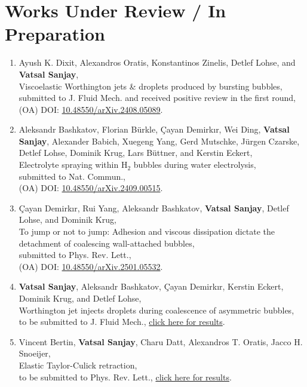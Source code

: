 \documentclass[10pt,a4paper,colorlinks,linkcolor=blue,urlcolor=blue,citecolor=blue]{moderncv}
\begin{document}
\section{Works Under Review / In Preparation}
\begin{enumerate}[leftmargin=1.25em]
	\item Ayush K. Dixit, Alexandros Oratis, Konstantinos Zinelis, Detlef Lohse, and \textbf{Vatsal Sanjay},\\
	Viscoelastic Worthington jets \& droplets produced by bursting bubbles,\\
	submitted to J. Fluid Mech. and received positive review in the first round,\\
	(OA) DOI: \href{https://doi.org/10.48550/arXiv.2408.05089}{{10.48550/arXiv.2408.05089}}.

	\item Aleksandr Bashkatov, Florian Bürkle, Çayan Demirkır, Wei Ding, \textbf{Vatsal Sanjay}, Alexander Babich, Xuegeng Yang, Gerd Mutschke, Jürgen Czarske, Detlef Lohse, Dominik Krug, Lars Büttner, and Kerstin Eckert,\\
	Electrolyte spraying within H$_2$ bubbles during water electrolysis,\\
	submitted to Nat. Commun.,\\
	(OA) DOI: \href{https://doi.org/10.48550/arXiv.2409.00515}{10.48550/arXiv.2409.00515}.

	\item Çayan Demirkır, Rui Yang, Aleksandr Bashkatov, \textbf{Vatsal Sanjay}, Detlef Lohse, and Dominik Krug,\\
	To jump or not to jump: Adhesion and viscous dissipation dictate the detachment of coalescing wall-attached bubbles,\\
	submitted to Phys. Rev. Lett.,\\
	(OA) DOI: \href{https://doi.org/10.48550/arXiv.2501.05532}{10.48550/arXiv.2501.05532}.

	\item \textbf{Vatsal Sanjay}, Aleksandr Bashkatov, Çayan Demirkır, Kerstin Eckert, Dominik Krug, and Detlef Lohse,\\
	Worthington jet injects droplets during coalescence of asymmetric bubbles,\\
	to be submitted to J. Fluid Mech., \href{https://youtu.be/WZonMHzzkXQ}{click here for results}.

	\item Vincent Bertin, \textbf{Vatsal Sanjay}, Charu Datt, Alexandros T. Oratis, Jacco H. Snoeijer,\\
	Elastic Taylor-Culick retraction,\\
	to be submitted to Phys. Rev. Lett., \href{https://tinyurl.com/2cvo89bd}{click here for results}.


\end{enumerate}
\end{document}
